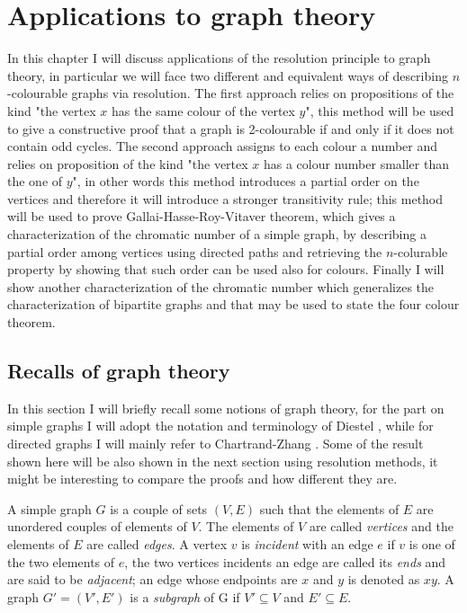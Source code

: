 \documentclass[a4paper,12pt,twoside]{book}
\begin{document}
\chapter{Applications to graph theory}
In this chapter I will discuss applications of the resolution principle to graph theory, in particular we will face two different and equivalent ways of describing $n$-colourable graphs via resolution. The first approach relies on propositions of the kind "the vertex $x$ has the same colour of the vertex $y$", this method will be used to give a constructive proof that a graph is 2-colourable if and only if it does not contain odd cycles. The second approach assigns to each colour a number and relies on proposition of the kind "the vertex $x$ has a colour number smaller than the one of $y$", in other words this method introduces a partial order on the vertices and therefore it will introduce a stronger transitivity rule; this method will be used to prove Gallai-Hasse-Roy-Vitaver theorem, which gives a characterization of the chromatic number of a simple graph, by describing a partial order among vertices using directed paths and retrieving the $n$-colurable property by showing that such order can be used also for colours. Finally I will show another characterization of the chromatic number which generalizes the characterization of bipartite graphs and that may be used to state the four colour theorem.


\newpage
\section{Recalls of graph theory}
In this section I will briefly recall some notions of graph theory, for the part on simple graphs I will adopt the notation and terminology of Diestel \cite{diestel}, while for directed graphs I will mainly refer to Chartrand-Zhang \cite{chrom}. Some of the result shown here will be also shown in the next section using resolution methods, it might be interesting to compare the proofs and how different they are.

A simple graph $G$ is a couple of sets $(V,E)$ such that the elements of $E$ are unordered couples of elements of $V$. The elements of $V$ are called \textit{vertices} and the elements of $E$ are called \textit{edges}. A vertex $v$ is \textit{incident} with an edge $e$ if $v$ is one of the two elements of $e$, the two vertices incidents an edge are called its \textit{ends} and are said to be \textit{adjacent}; an edge whose endpoints are $x$ and $y$ is denoted as $xy$. 
A graph $G'=(V',E')$ is a \textit{subgraph} of G if $V' \subseteq V$ and $E' \subseteq E$.
\end{document}
